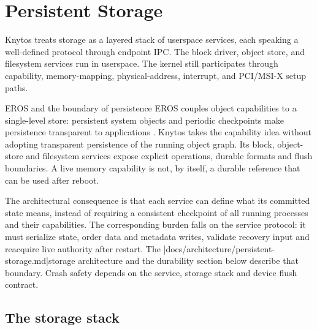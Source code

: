 \chapter{Persistent Storage}
\label{chap:storage}

Knytos treats storage as a layered stack of userspace services, each
speaking a well-defined protocol through endpoint IPC. The block driver,
object store, and filesystem services run in userspace. The kernel still
participates through capability, memory-mapping, physical-address, interrupt,
and PCI/MSI-X setup paths.

\begin{architecturalcomparison}{EROS and the boundary of persistence}
EROS couples object capabilities to a single-level store: persistent system
objects and periodic checkpoints make persistence transparent to applications
\cite{prior:eros}. Knytos takes the capability idea without adopting
transparent persistence of the running object graph. Its block, object-store
and filesystem services expose explicit operations, durable formats and flush
boundaries. A live memory capability is not, by itself, a durable reference
that can be used after reboot.

The architectural consequence is that each service can define what its
committed state means, instead of requiring a consistent checkpoint of all
running processes and their capabilities. The corresponding burden falls on
the service protocol: it must serialize state, order data and metadata writes,
validate recovery input and reacquire live authority after restart. The
\repofiletext|docs/architecture/persistent-storage.md|{storage architecture}
and the durability section below describe that boundary. Crash safety depends
on the service, storage stack and device flush contract.
\end{architecturalcomparison}

\section{The storage stack}

